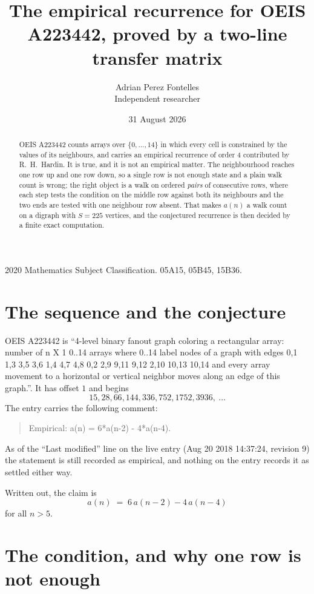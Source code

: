 \documentclass[11pt,a4paper]{article}
\title{The empirical recurrence for OEIS A223442, proved by a two-line transfer matrix}
\author{Adrian Perez Fontelles\\ \small Independent researcher}
\date{31 August 2026}
\theoremstyle{plain}
\theoremstyle{definition}
\begin{document}
\maketitle

\begin{abstract}
OEIS A223442 counts arrays over $\{0,\dots,14\}$ in which every cell is constrained by the
values of its neighbours, and carries an empirical recurrence of order $4$ contributed
by R.~H.~Hardin. It is true, and it is not an empirical matter. The neighbourhood reaches one
row up and one row down, so a single row is not enough state and a plain walk count
is wrong; the right object is a walk on ordered \emph{pairs} of consecutive rows, where
each step tests the condition on the middle row against both its neighbours and the two
ends are tested with one neighbour row absent. That makes $a(n)$ a walk count on a digraph
with $S=225$ vertices, and the conjectured recurrence is then decided by a finite exact
computation.
\end{abstract}

\noindent\small 2020 Mathematics Subject Classification. 05A15, 05B45, 15B36.\normalsize

\section{The sequence and the conjecture}

OEIS A223442 is ``4-level binary fanout graph coloring a rectangular array: number of n X 1 0..14 arrays where 0..14 label nodes of a graph with edges 0,1 1,3 3,5 3,6 1,4 4,7 4,8 0,2 2,9 9,11 9,12 2,10 10,13 10,14 and every array movement to a horizontal or vertical neighbor moves along an edge of this graph.''. It has offset $1$ and begins
\[
15, 28, 66, 144, 336, 752, 1752, 3936,\ \dots
\]
The entry carries the following comment:
\begin{quote}\small
Empirical: a(n) = 6*a(n-2) - 4*a(n-4).
\end{quote}
As of the ``Last modified'' line on the live entry (Aug 20 2018 14:37:24, revision 9) the statement is
still recorded as empirical, and nothing on the entry records it as settled either way.

Written out, the claim is
\begin{equation}\label{eq:conj}
a(n)\;=\;6\,a(n-2) - 4\,a(n-4)
\end{equation}
for all $n>5$.

\section{The condition, and why one row is not enough}
\end{document}

